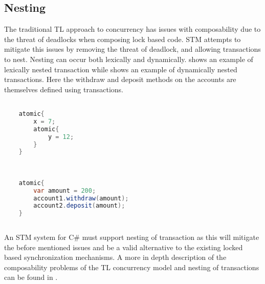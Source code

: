 \subsection{Nesting}
The traditional \ac{TL} approach to concurrency has issues with composability due to the threat of deadlocks\cite[p. 58]{sutter2005software} when composing lock based code. \ac{STM} attempts to mitigate this issues by removing the threat of deadlock, and allowing transactions to nest. Nesting can occur both lexically and dynamically\cite[p. 1]{kumar2011hparstm}\cite[p. 42]{harris2010transactional}\cite[p. 2081]{herlihy2011tm}.  shows an example of lexically nested transaction while  shows an example of dynamically nested transactions. Here the withdraw and deposit methods on the accounts are themselves defined using transactions.

\begin{lstlisting}[label=lst:stm_nested_transactions,
  caption={Lexically nested transactions},
  language=Java,  
  showspaces=false,
  showtabs=false,
  breaklines=true,
  showstringspaces=false,
  breakatwhitespace=true,
  commentstyle=\color{greencomments},
  keywordstyle=\color{bluekeywords},
  stringstyle=\color{redstrings},
  morekeywords={atomic, retry, orElse, var}]  % Start your code-block

	atomic{
		x = 7;
		atomic{
			y = 12;		
		}
	}
       
\end{lstlisting}

\begin{lstlisting}[label=lst:stm_nested_transactions_real,
  caption={Dynamically nested transactions},
  language=Java,  
  showspaces=false,
  showtabs=false,
  breaklines=true,
  showstringspaces=false,
  breakatwhitespace=true,
  commentstyle=\color{greencomments},
  keywordstyle=\color{bluekeywords},
  stringstyle=\color{redstrings},
  morekeywords={atomic, retry, orElse, var}]  % Start your code-block

	atomic{
		var amount = 200;
		account1.withdraw(amount);
		account2.deposit(amount);
	}
       
\end{lstlisting}

An \ac{STM} system for C\# must support nesting of transaction as this will mitigate the before mentioned issues and be a valid alternative to the existing locked based synchronization mechanisms. A more in depth description of the composability problems of the \ac{TL} concurrency model and nesting of transactions can be found in \cite{dpt907e14trending}.


